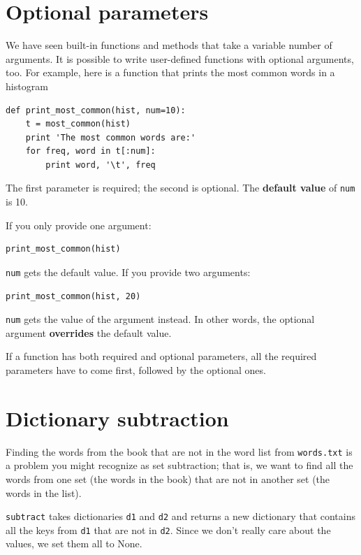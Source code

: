 \documentclass[10pt]{book}
\begin{document}
\begin{CJK}{UTF8}{gbsn}
\section{Optional parameters}

We have seen built-in functions and methods that take a variable
number of arguments.  It is possible to write user-defined functions
with optional arguments, too.  For example, here is a function that
prints the most common words in a histogram

\begin{verbatim}
def print_most_common(hist, num=10):
    t = most_common(hist)
    print 'The most common words are:'
    for freq, word in t[:num]:
        print word, '\t', freq
\end{verbatim}

The first parameter is required; the second is optional.
The {\bf default value} of {\tt num} is 10.

If you only provide one argument:

\begin{verbatim}
print_most_common(hist)
\end{verbatim}

{\tt num} gets the default value.  If you provide two arguments:

\begin{verbatim}
print_most_common(hist, 20)
\end{verbatim}

{\tt num} gets the value of the argument instead.  In other
words, the optional argument {\bf overrides} the default value.

If a function has both required and optional parameters, all
the required parameters have to come first, followed by the
optional ones.


\section{Dictionary subtraction}

Finding the words from the book that are not in the word list
from {\tt words.txt} is a problem you might recognize as set
subtraction; that is, we want to find all the words from one
set (the words in the book) that are not in another set (the
words in the list).

{\tt subtract} takes dictionaries {\tt d1} and {\tt d2} and returns a
new dictionary that contains all the keys from {\tt d1} that are not
in {\tt d2}.  Since we don't really care about the values, we
set them all to None.


\end{CJK}
\end{document}
